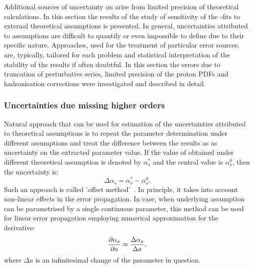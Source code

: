 Additional sources of uncertainty on \as arise from limited precision of theoretical calculations. In this section the results of the study of sensitivity of the \asz-fits to external theoretical assumptions is presented. In general, uncertainties attributed to assumptions are difficult to quantify or even impossible to define due to their specific nature. Approaches, used for the treatment of particular error sources, are, typically, tailored for each problem and statistical interpretation of the stability of the results if often doubtful. In this section the errors due to truncation of perturbative series, limited precision of the proton PDFs and hadronisation corrections were investigated and described in detail.

\subsubsection{Uncertainties due missing higher orders}
\label{subsec:asscalevar}
Natural approach that can be used for estimation of the uncertainties attributed to theoretical assumptions is to repeat the parameter determination under different assumptions and treat the difference between the results as as uncertainty on the extracted parameter value. If the value of \asz obtained under different theoretical assumption is denoted by $\alpha_s^{\ast}$ and the central value is $\alpha_s^0$, then the uncertainty is:
\begin{equation}
 \Delta\alpha_s = \alpha_s^{\ast} - \alpha_s^0.
\end{equation}
Such an approach is called 'offset method'~\cite{amanda}. In principle, it takes into account non-linear effects in the error propagation. In case, when underlying assumption can be parametrised by a single continuous parameter, this method can be used for linear error propagation employing numerical approximation for the derivative:
\begin{equation}
 \frac{\partial \mbox{$\alpha_{s}$}}{ \partial a} \approx \frac{\Delta\alpha_s}{\Delta a},
\end{equation}
where $\Delta a$ is an infinitesimal change of the parameter in question.

